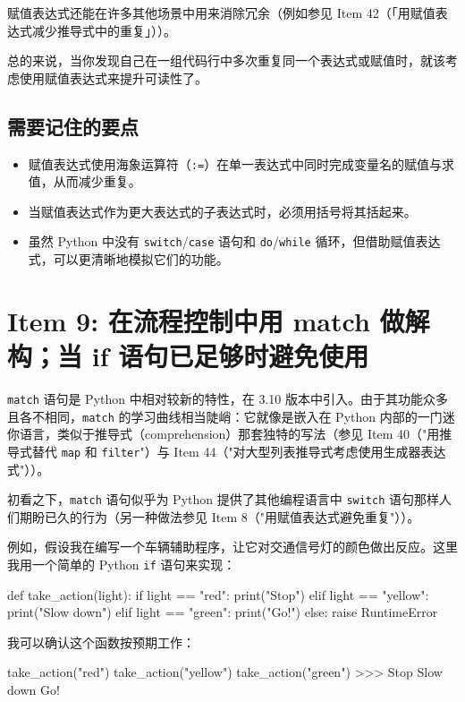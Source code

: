 赋值表达式还能在许多其他场景中用来消除冗余（例如参见 Item 42（「用赋值表达式减少推导式中的重复」））。

总的来说，当你发现自己在一组代码行中多次重复同一个表达式或赋值时，就该考虑使用赋值表达式来提升可读性了。

\subsection{需要记住的要点}

\begin{itemize}
\item 赋值表达式使用海象运算符（\texttt{:=}）在单一表达式中同时完成变量名的赋值与求值，从而减少重复。
\item 当赋值表达式作为更大表达式的子表达式时，必须用括号将其括起来。
\item 虽然 Python 中没有 \texttt{switch}/\texttt{case} 语句和 \texttt{do}/\texttt{while} 循环，但借助赋值表达式，可以更清晰地模拟它们的功能。
\end{itemize}

\section{Item 9: 在流程控制中用 match 做解构；当 if 语句已足够时避免使用}

\verb|match| 语句是 Python 中相对较新的特性，在 3.10 版本中引入。由于其功能众多且各不相同，\verb|match| 的学习曲线相当陡峭：它就像是嵌入在 Python 内部的一门迷你语言，类似于推导式（comprehension）那套独特的写法（参见 Item 40（"用推导式替代 \verb|map| 和 \verb|filter|"）与 Item 44（"对大型列表推导式考虑使用生成器表达式"））。

初看之下，\verb|match| 语句似乎为 Python 提供了其他编程语言中 \verb|switch| 语句那样人们期盼已久的行为（另一种做法参见 Item 8（"用赋值表达式避免重复"））。

例如，假设我在编写一个车辆辅助程序，让它对交通信号灯的颜色做出反应。这里我用一个简单的 Python \verb|if| 语句来实现：

\begin{codebox}[python]
def take_action(light):
    if light == "red":
        print("Stop")
    elif light == "yellow":
        print("Slow down")
    elif light == "green":
        print("Go!")
    else:
        raise RuntimeError
\end{codebox}

我可以确认这个函数按预期工作：

\begin{codebox}[python]
take_action("red")
take_action("yellow")
take_action("green")
>>>
Stop
Slow down
Go!
\end{codebox}

